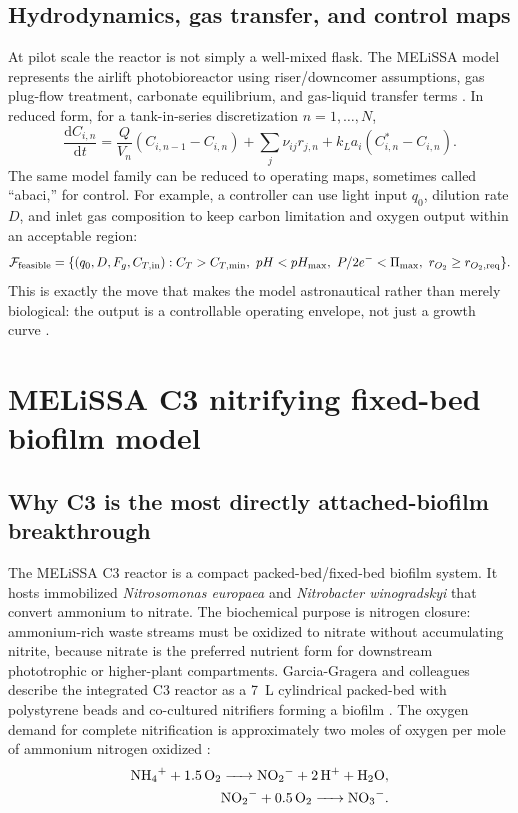 \documentclass[11pt]{article}
\newcommand{\MEL}{MELiSSA}
\newcommand{\Nts}{\textit{Nitrosomonas europaea}}
\newcommand{\Ntb}{\textit{Nitrobacter winogradskyi}}
\newcommand{\dd}{\mathrm{d}}
\begin{document}
\subsection{Hydrodynamics, gas transfer, and control maps}

At pilot scale the reactor is not simply a well-mixed flask. The \MEL{} model represents the airlift photobioreactor using riser/downcomer assumptions, gas plug-flow treatment, carbonate equilibrium, and gas-liquid transfer terms \parencite[6]{poughon2021}. In reduced form, for a tank-in-series discretization $n=1,\ldots,N$,
\begin{equation}
  \frac{\dd C_{i,n}}{\dd t}=\frac{Q}{V_n}(C_{i,n-1}-C_{i,n})+\sum_j \nu_{ij}r_{j,n}+k_La_i(C^*_{i,n}-C_{i,n}).
  \label{eq:tanks_series_pbr}
\end{equation}
The same model family can be reduced to operating maps, sometimes called ``abaci,'' for control. For example, a controller can use light input $q_0$, dilution rate $D$, and inlet gas composition to keep carbon limitation and oxygen output within an acceptable region:
\begin{equation}
  \mathcal{F}_{\rm feasible}=\{(q_0,D,F_g,C_{T,\rm in}): C_T>C_{T,\min},\ pH<pH_{\max},\ P/2e^-<\Pi_{\max},\ r_{O_2}\ge r_{O_2,\rm req}\}.
  \label{eq:feasible_region}
\end{equation}
This is exactly the move that makes the model astronautical rather than merely biological: the output is a controllable operating envelope, not just a growth curve \parencite[7--9]{poughon2021}.

\section{MELiSSA C3 nitrifying fixed-bed biofilm model}

\subsection{Why C3 is the most directly attached-biofilm breakthrough}

The \MEL{} C3 reactor is a compact packed-bed/fixed-bed biofilm system. It hosts immobilized \Nts{} and \Ntb{} that convert ammonium to nitrate. The biochemical purpose is nitrogen closure: ammonium-rich waste streams must be oxidized to nitrate without accumulating nitrite, because nitrate is the preferred nutrient form for downstream phototrophic or higher-plant compartments. Garcia-Gragera and colleagues describe the integrated C3 reactor as a \SI{7}{L} cylindrical packed-bed with polystyrene beads and co-cultured nitrifiers forming a biofilm \parencite[2]{garcia2021}. The oxygen demand for complete nitrification is approximately two moles of oxygen per mole of ammonium nitrogen oxidized \parencite[2]{garcia2021}:
\begin{align}
  \ce{NH4+ + 1.5O2 -> NO2- + 2H+ + H2O},\label{eq:aob}\\
  \ce{NO2- + 0.5O2 -> NO3-}.\label{eq:nob}
\end{align}
\end{document}
